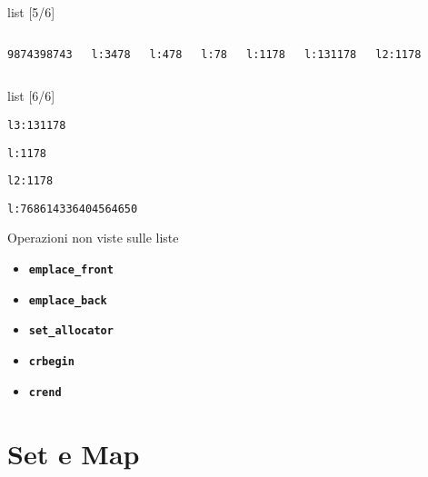 \documentclass[xcolor={dvipsnames, svgnames, x11names, table}, 10pt]{beamer}
\begin{document}
\begin{frame}[t, fragile]{list [5/6]}

\begin{columns}
    

    \texttt{9874398743}
    
    \texttt{l:3478}
    
    \texttt{l:478}
    
    \texttt{l:78}
    
    \texttt{l:1178}
    
    \texttt{l:131178}
    
    \texttt{l2:1178}
    
\end{columns}

\end{frame}

\begin{frame}[t, fragile]{list [6/6]}


    \texttt{l3:131178}
    
    \texttt{l:1178}
    
    \texttt{l2:1178}
    
    \texttt{l:768614336404564650}

\end{frame}

\begin{frame}{Operazioni non viste sulle liste}
    
    \begin{itemize}
        \item \textbf{\texttt{emplace\_front}}
        \item \textbf{\texttt{emplace\_back}}
        \item \textbf{\texttt{set\_allocator}}
        \item \textbf{\texttt{crbegin}}
        \item \textbf{\texttt{crend}}
    \end{itemize}
    
\end{frame}

\section{Set e Map}
\end{document}
